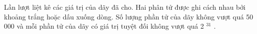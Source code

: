 Lần lượt liệt kê các giá trị của dãy đã cho. Hai phân tử được ghi cách nhau bởi khoảng trắng hoặc dấu xuống dòng. Số lượng phần tử của dãy không vượt quá 50 000 và mỗi phần tử của dãy có giá trị tuyệt đối không vượt quá 2   $^    31   $   .